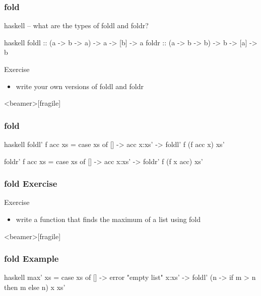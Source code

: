 \documentclass[dvipsnames]{beamer}
\theoremstyle{plain}
\begin{document}
\begin{frame}[fragile]
  \frametitle{fold}

  \begin{example}[Haskell]
    \begin{pygments}{haskell}
-- what are the types of foldl and foldr?
    \end{pygments}

    \pause
    \begin{pygments}{haskell}
foldl :: (a -> b -> a) -> a -> [b] -> a
foldr :: (a -> b -> b) -> b -> [a] -> b
    \end{pygments}
  \end{example}

  \pause
  \begin{block}{Exercise}
    \begin{itemize}
      \item write your own versions of foldl and foldr
    \end{itemize}
  \end{block}
\end{frame}

\begin{frame}<beamer>[fragile]
  \frametitle{fold}

  \begin{example}[Haskell]
    \begin{pygments}{haskell}
foldl' f acc xs =
    case xs of
      [] -> acc
      x:xs' -> foldl' f (f acc x) xs'

foldr' f acc xs =
    case xs of
      [] -> acc
      x:xs' -> foldr' f (f x acc) xs'
    \end{pygments}
  \end{example}
\end{frame}

\begin{frame}[fragile]
  \frametitle{fold Exercise}

  \begin{block}{Exercise}
    \begin{itemize}
      \item write a function that finds the maximum of a list using fold
    \end{itemize}
  \end{block}
\end{frame}

\begin{frame}<beamer>[fragile]
  \frametitle{fold Example}

  \begin{example}
    \begin{pygments}{haskell}
max' xs =
    case xs of
      [] -> error "empty list"
      x:xs' -> foldl' (\m n -> if m > n then m else n) x xs'
    \end{pygments}
  \end{example}
\end{frame}
\end{document}
